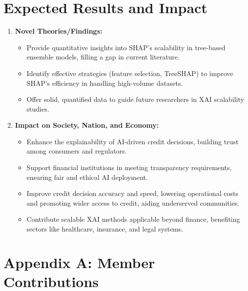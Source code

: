 \documentclass[12pt,a4paper]{article}
\begin{document}
\section{Expected Results and Impact}
\vspace{-1em}
\begin{enumerate}
    \item \textbf{Novel Theories/Findings:}
    \begin{itemize}
        \item Provide quantitative insights into SHAP’s scalability in tree-based ensemble models, filling a gap in current literature.
        \item Identify effective strategies (feature selection, TreeSHAP) to improve SHAP’s efficiency in handling high-volume datasets.
        \item Offer solid, quantified data to guide future researchers in XAI scalability studies.
    \end{itemize}

    \item \textbf{Impact on Society, Nation, and Economy:}
    \begin{itemize}
        \item Enhance the explainability of AI-driven credit decisions, building trust among consumers and regulators.
        \item Support financial institutions in meeting transparency requirements, ensuring fair and ethical AI deployment.
        \item Improve credit decision accuracy and speed, lowering operational costs and promoting wider access to credit, aiding underserved communities.
        \item Contribute scalable XAI methods applicable beyond finance, benefiting sectors like healthcare, insurance, and legal systems.
    \end{itemize}
\end{enumerate}




\newpage
 
 


\appendix
\section{Appendix A: Member Contributions}

\vspace{-10pt}
\end{document}

